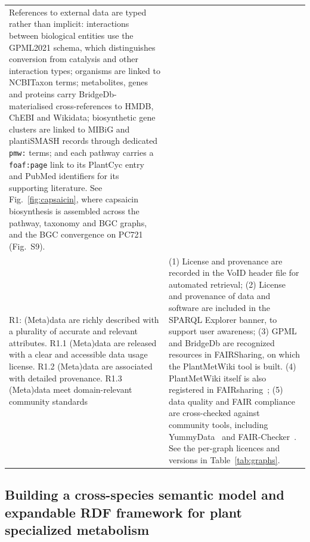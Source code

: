 \documentclass[11pt,a4paper]{article}
\newcommand{\rev}[1]{#1}
\begin{document}
{\begin{longtable}{p{} p{}}
References to external data are typed rather than implicit: interactions between biological
entities use the GPML2021 schema, which distinguishes conversion from catalysis and other
interaction types; organisms are linked to NCBITaxon terms; metabolites, genes and proteins carry
BridgeDb-materialised cross-references to HMDB, ChEBI and Wikidata; biosynthetic gene clusters are
linked to MIBiG and plantiSMASH records through dedicated \texttt{pmw:} terms; and each pathway carries a
\texttt{foaf:page} link to its PlantCyc entry and PubMed identifiers for its supporting literature.
\rev{See Fig.~\ref{fig:capsaicin}, where capsaicin biosynthesis is assembled across the
pathway, taxonomy and BGC graphs, and the BGC convergence on PC721 (Fig.~S9).} \\
\addlinespace
R1: (Meta)data are richly described with a plurality of accurate and relevant attributes.
R1.1 (Meta)data are released with a clear and accessible data usage license.
R1.2 (Meta)data are associated with detailed provenance.
R1.3 (Meta)data meet domain-relevant community standards &
(1) License and provenance are recorded in the VoID header file for automated retrieval;
(2) License and provenance of data and software are included in the SPARQL Explorer banner, to support user
awareness;
(3) GPML and BridgeDb are recognized resources in FAIRSharing, on which the PlantMetWiki tool is
built. (4) PlantMetWiki itself is also registered in FAIRsharing~\cite{plantmetwiki2026fairsharing}; (5) data quality and FAIR compliance are cross-checked against community tools, including YummyData~\cite{yamamoto2018} and FAIR-Checker~\cite{gaignard2023}.
\rev{See the per-graph licences and versions in Table~\ref{tab:graphs}.} \\
\end{longtable}
}

\subsection*{Building a cross-species semantic model and expandable RDF framework for plant specialized metabolism}

\end{document}
